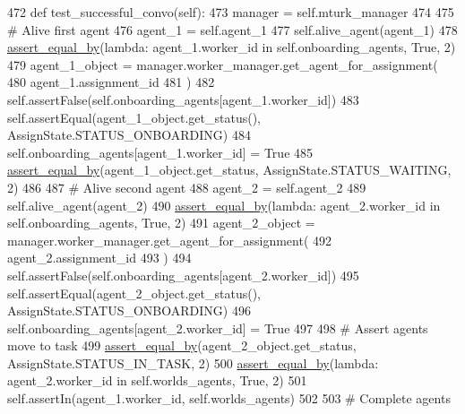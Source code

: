 \begin{DoxyCode}
472     \textcolor{keyword}{def }test\_successful\_convo(self):
473         manager = self.mturk\_manager
474 
475         \textcolor{comment}{# Alive first agent}
476         agent\_1 = self.agent\_1
477         self.alive\_agent(agent\_1)
478         \hyperlink{namespaceparlai_1_1mturk_1_1core_1_1test_1_1test__full__system_a0b463246d35658a2e422010f13dcf819}{assert\_equal\_by}(\textcolor{keyword}{lambda}: agent\_1.worker\_id \textcolor{keywordflow}{in} self.onboarding\_agents, \textcolor{keyword}{True}, 2)
479         agent\_1\_object = manager.worker\_manager.get\_agent\_for\_assignment(
480             agent\_1.assignment\_id
481         )
482         self.assertFalse(self.onboarding\_agents[agent\_1.worker\_id])
483         self.assertEqual(agent\_1\_object.get\_status(), AssignState.STATUS\_ONBOARDING)
484         self.onboarding\_agents[agent\_1.worker\_id] = \textcolor{keyword}{True}
485         \hyperlink{namespaceparlai_1_1mturk_1_1core_1_1test_1_1test__full__system_a0b463246d35658a2e422010f13dcf819}{assert\_equal\_by}(agent\_1\_object.get\_status, AssignState.STATUS\_WAITING, 2)
486 
487         \textcolor{comment}{# Alive second agent}
488         agent\_2 = self.agent\_2
489         self.alive\_agent(agent\_2)
490         \hyperlink{namespaceparlai_1_1mturk_1_1core_1_1test_1_1test__full__system_a0b463246d35658a2e422010f13dcf819}{assert\_equal\_by}(\textcolor{keyword}{lambda}: agent\_2.worker\_id \textcolor{keywordflow}{in} self.onboarding\_agents, \textcolor{keyword}{True}, 2)
491         agent\_2\_object = manager.worker\_manager.get\_agent\_for\_assignment(
492             agent\_2.assignment\_id
493         )
494         self.assertFalse(self.onboarding\_agents[agent\_2.worker\_id])
495         self.assertEqual(agent\_2\_object.get\_status(), AssignState.STATUS\_ONBOARDING)
496         self.onboarding\_agents[agent\_2.worker\_id] = \textcolor{keyword}{True}
497 
498         \textcolor{comment}{# Assert agents move to task}
499         \hyperlink{namespaceparlai_1_1mturk_1_1core_1_1test_1_1test__full__system_a0b463246d35658a2e422010f13dcf819}{assert\_equal\_by}(agent\_2\_object.get\_status, AssignState.STATUS\_IN\_TASK, 2)
500         \hyperlink{namespaceparlai_1_1mturk_1_1core_1_1test_1_1test__full__system_a0b463246d35658a2e422010f13dcf819}{assert\_equal\_by}(\textcolor{keyword}{lambda}: agent\_2.worker\_id \textcolor{keywordflow}{in} self.worlds\_agents, \textcolor{keyword}{True}, 2)
501         self.assertIn(agent\_1.worker\_id, self.worlds\_agents)
502 
503         \textcolor{comment}{# Complete agents}

\end{DoxyCode}
